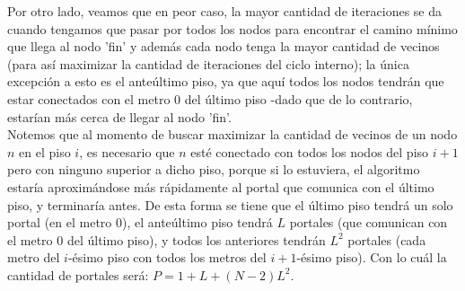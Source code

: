 \documentclass{article}
\theoremstyle{definition}
\theoremstyle{remark}
\begin{document}
Por otro lado, veamos que en peor caso, la mayor cantidad de iteraciones se da cuando tengamos que pasar por todos los nodos para encontrar el camino mínimo que llega al nodo 'fin' y además cada nodo tenga la mayor cantidad de vecinos (para así maximizar la cantidad de iteraciones del ciclo interno); la única excepción a esto es el anteúltimo piso, ya que aquí todos los nodos tendrán que estar conectados con el metro 0 del último piso -dado que de lo contrario, estarían más cerca de llegar al nodo 'fin'. \\
Notemos que al momento de buscar maximizar la cantidad de vecinos de un nodo $n$ en el piso $i$, es necesario que $n$ esté conectado con todos los nodos del piso $i+1$ pero con ninguno superior a dicho piso, porque si lo estuviera, el algoritmo estaría aproximándose más rápidamente al portal que comunica con el último piso, y terminaría antes. De esta forma se tiene que el último piso tendrá un solo portal (en el metro 0), el anteúltimo piso tendrá $L$ portales (que comunican con el metro 0 del último piso), y todos los anteriores tendrán $L^2$ portales (cada metro del $i$-ésimo piso con todos los metros del $i+1$-ésimo piso). Con lo cuál la cantidad de portales será: $P = 1+L+(N-2)L^2$.
\end{document}
